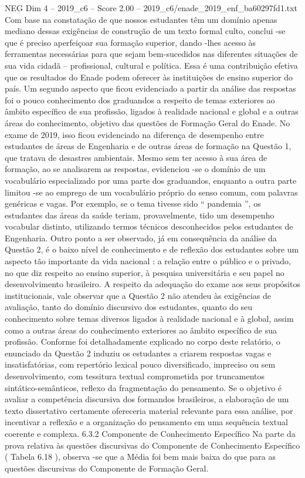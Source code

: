 \begin{textsample}{NEG Dim 4 – 2019\_c6 – Score 2.00 – 2019\_c6/enade\_2019\_enf\_ba60297fd1.txt}
Com base na constatação de que nossos estudantes têm um domínio apenas mediano dessas exigências de construção de um texto formal culto, conclui -se que é preciso aperfeiçoar sua formação superior, dando -lhes acesso às ferramentas necessárias para que sejam bem-sucedidos nas diferentes situações de sua vida cidadã – profissional, cultural e política.
Essa é uma contribuição efetiva que os resultados do Enade podem oferecer às instituições de ensino superior do país.
Um segundo aspecto que ficou evidenciado a partir da análise das respostas foi o pouco conhecimento dos graduandos a respeito de temas exteriores ao âmbito específico de sua profissão, ligados à realidade nacional e global e a outras áreas do conhecimento, objetivo das questões de Formação Geral do Enade.
No exame de 2019, isso ficou evidenciado na diferença de desempenho entre estudantes de áreas de Engenharia e de outras áreas de formação na Questão 1, que tratava de desastres ambientais.
Mesmo sem ter acesso à sua área de formação, ao se analisarem as respostas, evidenciou -se o domínio de um vocabulário especializado por uma parte dos graduandos, enquanto a outra parte limitou -se ao emprego de um vocabulário próprio do senso comum, com palavras genéricas e vagas.
Por exemplo, se o tema tivesse sido “ pandemia ”, os estudantes das áreas da saúde teriam, provavelmente, tido um desempenho vocabular distinto, utilizando termos técnicos desconhecidos pelos estudantes de Engenharia.
Outro ponto a ser observado, já em consequência da análise da Questão 2, é o baixo nível de conhecimento e de reflexão dos estudantes sobre um aspecto tão importante da vida nacional : a relação entre o público e o privado, no que diz respeito ao ensino superior, à pesquisa universitária e seu papel no desenvolvimento brasileiro.
A respeito da adequação do exame aos seus propósitos institucionais, vale observar que a Questão 2 não atendeu às exigências de avaliação, tanto do domínio discursivo dos estudantes, quanto do seu conhecimento sobre temas diversos ligados à realidade nacional e à global, assim como a outras áreas do conhecimento exteriores ao âmbito específico de sua profissão.
Conforme foi detalhadamente explicado no corpo deste relatório, o enunciado da Questão 2 induziu os estudantes a criarem respostas vagas e insatisfatórias, com repertório lexical pouco diversificado, impreciso ou sem desenvolvimento, com tessitura textual comprometida por truncamentos sintático-semânticos, reflexo da fragmentação do pensamento.
Se o objetivo é avaliar a competência discursiva dos formandos brasileiros, a elaboração de um texto dissertativo certamente ofereceria material relevante para essa análise, por incentivar a reflexão e a organização do pensamento em uma sequência textual coerente e complexa. 6.3.2 Componente de Conhecimento Específico Na parte da prova relativa às questões discursivas do Componente de Conhecimento Específico ( Tabela 6.18 ), observa -se que a Média foi bem mais baixa do que para as questões discursivas do Componente de Formação Geral.

\end{textsample}

